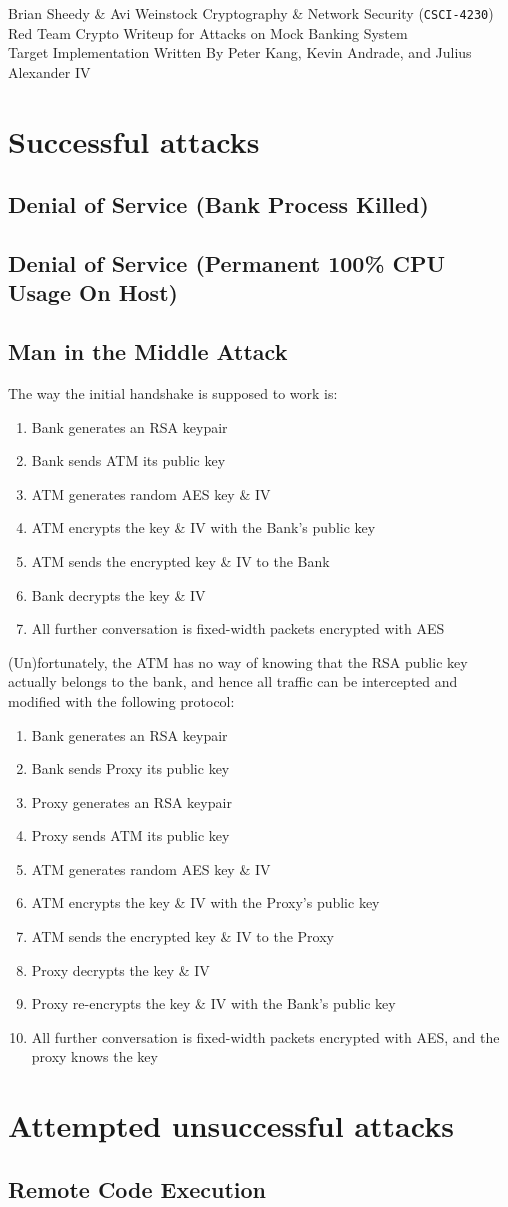 \documentclass[12pt]{article}
\begin{document}
\noindent
Brian Sheedy \& Avi Weinstock \hfill Cryptography \& Network Security (\Verb|CSCI-4230|)\\
Red Team Crypto Writeup for Attacks on Mock Banking System\\
Target Implementation Written By Peter Kang, Kevin Andrade, and Julius Alexander IV
\doublespace

\section*{Successful attacks}
\subsection*{Denial of Service (Bank Process Killed)}
\subsection*{Denial of Service (Permanent 100\% CPU Usage On Host)}
\subsection*{Man in the Middle Attack}
The way the initial handshake is supposed to work is:
\begin{enumerate}[1)]
\item Bank generates an RSA keypair
\item Bank sends ATM its public key
\item ATM generates random AES key \& IV
\item ATM encrypts the key \& IV with the Bank's public key
\item ATM sends the encrypted key \& IV to the Bank
\item Bank decrypts the key \& IV
\item All further conversation is fixed-width packets encrypted with AES
\end{enumerate}
(Un)fortunately, the ATM has no way of knowing that the RSA public key actually belongs to the bank, and hence all traffic can be intercepted and modified with the following protocol:
\begin{enumerate}[1)]
\item Bank generates an RSA keypair
\item Bank sends Proxy its public key
\item Proxy generates an RSA keypair
\item Proxy sends ATM its public key
\item ATM generates random AES key \& IV
\item ATM encrypts the key \& IV with the Proxy's public key
\item ATM sends the encrypted key \& IV to the Proxy
\item Proxy decrypts the key \& IV
\item Proxy re-encrypts the key \& IV with the Bank's public key
\item All further conversation is fixed-width packets encrypted with AES, and the proxy knows the key
\end{enumerate}
\section*{Attempted unsuccessful attacks}
\subsection*{Remote Code Execution}
\end{document}
